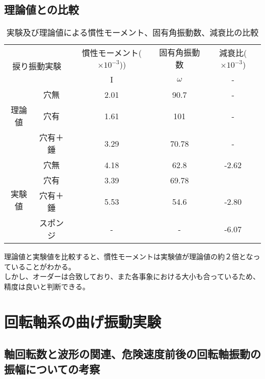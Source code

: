 \documentclass{jsarticle}
\begin{document}
  \subsection{理論値との比較}
  \begin{table}[H]
   \begin{center}
    \begin{tabular}{|c|c||c|c|c|} \hline
     \multicolumn{2}{|c||}{\multirow{2}{*}{捩り振動実験}}
     & \multicolumn{1}{c|}{慣性モーメント($\times10^{-3}$))} 
     & \multicolumn{1}{c|}{固有角振動数} & \multicolumn{1}{c|}{減衰比($\times10^{-3}$)}\\ \cline{3-5}
     \multicolumn{2}{|c||}{}     
     & \multicolumn{1}{c|}{I} 
     & \multicolumn{1}{c|}{$\omega$} & \multicolumn{1}{c|}{-}\\ \hline \hline
            &穴無    &2.01 &90.7 &- \\ \cline{2-5} 
     理論値 &穴有     &1.61 &101  &- \\ \cline{2-5}
            &穴有＋錘 &3.29 &70.78 &- \\ \hline
     \multirow{4}{*}{実験値}
            &穴無     &4.18 &62.8 &-2.62\\ \cline{2-5}
            &穴有     &3.39   &69.78 &\\ \cline{2-5}
            &穴有＋錘 &5.53 &54.6 &-2.80\\ \cline{2-5}
            &スポンジ &-       &- &-6.07\\ \hline

    \end{tabular}
   \end{center}
   \caption{実験及び理論値による慣性モーメント、固有角振動数、減衰比の比較}
   \label{tbl:ltx-tbl2}
  \end{table}
  
  理論値と実験値を比較すると、慣性モーメントは実験値が理論値の約２倍となっていることがわかる。\\
  しかし、オーダーは合致しており、また各事象における大小も合っているため、精度は良いと判断できる。
  
 \section{回転軸系の曲げ振動実験}
  \subsection{軸回転数と波形の関連、危険速度前後の回転軸振動の振幅についての考察}
\end{document}

